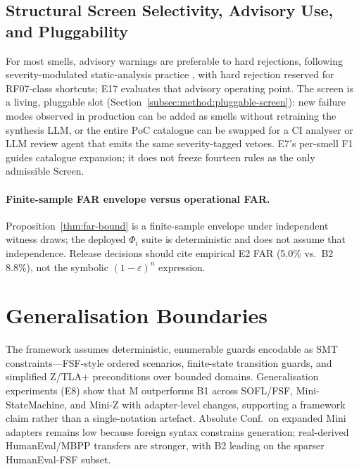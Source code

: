 \subsection{Structural Screen Selectivity, Advisory Use, and Pluggability}

For most smells, advisory warnings are preferable to hard rejections,
following severity-modulated static-analysis practice
\cite{hovemeyer2004findbugs,ayewah2007findbugs}, with hard rejection reserved
for RF07-class shortcuts; E17 evaluates that advisory operating point.
The screen is a living, pluggable slot
(Section~\ref{subsec:method:pluggable-screen}): new failure modes observed in
production can be added as smells without retraining the synthesis LLM, or the
entire PoC catalogue can be swapped for a CI analyser or LLM review agent that
emits the same severity-tagged vetoes.
E7's per-smell F1 guides catalogue expansion; it does not freeze fourteen
rules as the only admissible $\mathrm{Screen}$.

\paragraph{Finite-sample FAR envelope versus operational FAR.}
Proposition~\ref{thm:far-bound} is a finite-sample envelope under
independent witness draws; the deployed $\Phi_i$ suite is deterministic and
does not assume that independence.
Release decisions should cite empirical E2 FAR (5.0\% vs.\ B2 8.8\%), not the
symbolic $(1-\varepsilon)^n$ expression.


\section{Generalisation Boundaries}
\label{sec:disc:generalisation}

The framework assumes deterministic, enumerable guards encodable as SMT
constraints---FSF-style ordered scenarios, finite-state transition guards,
and simplified Z/TLA+ preconditions over bounded domains.
Generalisation experiments (E8) show that M outperforms B1 across SOFL/FSF,
Mini-StateMachine, and Mini-Z with adapter-level changes, supporting a
framework claim rather than a single-notation artefact.
Absolute Conf.\ on expanded Mini adapters remains low because foreign syntax
constrains generation; real-derived HumanEval/MBPP transfers are stronger,
with B2 leading on the sparser HumanEval-FSF subset.

